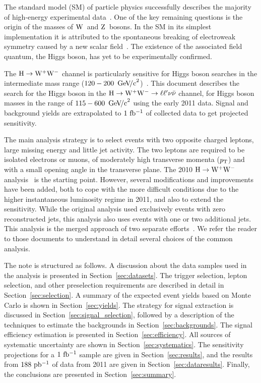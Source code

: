 The standard model (SM) of particle physics successfully describes the majority of high-energy
experimental data~\cite{pdg}. One of the key remaining questions is the origin of the masses of
$\mathrm{W}$~and $\mathrm{Z}$~bosons.  In the SM in its simplest implementation it is attributed to the spontaneous
breaking of electroweak symmetry caused by a new scalar field~\cite{Higgs1, Higgs2, Higgs3}. The
existence of the associated field quantum, the Higgs boson, has yet to be experimentally confirmed.

The $\mathrm{H}\to\mathrm{W}^+\mathrm{W}^-$ channel is particularly sensitive for Higgs boson searches in the intermediate mass
range ($120-200~\,\mathrm{Ge\kern -0.1em V\!/c}^2$)~\cite{dittmar}. This document describes the search for the Higgs boson 
in the $\mathrm{H}\rightarrow\mathrm{W}^+\mathrm{W}^- \rightarrow \ell\ell^{\prime}\nu\bar{\nu}$ channel, for Higgs boson masses in the range of 
$115-600~\,\mathrm{Ge\kern -0.1em V\!/c}^2$ using the early 2011 data. Signal and background yields are extrapolated to 
$1~\mathrm{fb^{-1}}$ of collected data to get projected sensitivity.
    
The main analysis strategy is to select events with two opposite charged leptons, large missing
energy and little jet activity. The two leptons are required to be isolated electrons or muons, of
moderately high transverse momenta ($p_\mathrm{T}$) and with a small opening angle in the transverse
plane. The 2010 $\mathrm{H}\to\mathrm{W}^+\mathrm{W}^-$ analysis~\cite{HWW2010} is the starting point. However, several
modifications and improvements have been added, both to cope with the more difficult conditions due
to the higher instantaneous luminosity regime in 2011, and also to extend the sensitivity.  While
the original analysis used exclusively events with zero reconstructed jets, this analysis also uses
events with one or two additional jets. This analysis is the merged approach of two separate
efforts~\cite{HWWAnalysis_Alpha,HWWAnalysis_A}. We refer the reader to those documents to understand
in detail several choices of the common analysis.

The note is structured as follows. A discussion about the data samples used in the analysis is
presented in Section~\ref{sec:datasets}.  The trigger selection, lepton selection, and other
preselection requirements are described in detail in Section~\ref{sec:selection}.  A summary of the
expected event yields based on Monte Carlo is shown in Section~\ref{sec:yields}.  The strategy for
signal extraction is discussed in Section~\ref{sec:signal_selection}, followed by a description of
the techniques to estimate the backgrounds in Section~\ref{sec:backgrounds}. The signal efficiency
estimation is presented in Section~\ref{sec:efficiency}.  All sources of systematic uncertainty are
shown in Section~\ref{sec:systematics}.  The sensitivity projections for a $1~\mathrm{fb^{-1}}$ sample are given
in Section~\ref{sec:results}, and the results from $188~\mathrm{pb^{-1}}$ of data from 2011 are given in
Section~\ref{sec:dataresults}.  Finally, the conclusions are presented in Section~\ref{sec:summary}.
